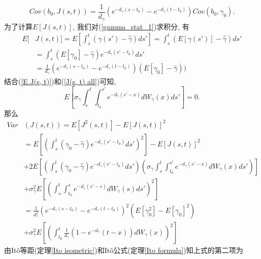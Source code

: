 \documentclass[notitlepage,cs4size,punct,oneside]{ctexrep}
\numberwithin{equation}{section}
\theoremstyle{mystyle}
\begin{document}
\begin{equation} \label{Cov b0 J(s, t)}
Cov(b_0, J(s, t)) = \frac{1}{d_\gamma}(e^{-d_\gamma(s-t_0)}-e^{-d_\gamma(t-t_0)})Cov(b_0, \gamma_0).
\end{equation}
为了计算$E[J(s, t)]$, 我们对(\ref{gamma_stat_1})求积分, 有
\begin{equation} \label{E J(s, t)}
\begin{split}
E[&J(s, t)] = E\left[\int_s^t (\gamma(s')-\hat{\gamma})ds'\right] = \int_s^t (E[\gamma(s')]-\hat{\gamma})ds' \\
&= \int_s^t (E[\gamma_0]-\hat{\gamma})e^{-d_\gamma(s'-t_0)}ds' \\
&= \frac{1}{d_\gamma}(e^{-d_\gamma(s-t_0)}-e^{-d_\gamma(t-t_0)})(E[\gamma_0]-\hat{\gamma}))
\end{split}
\end{equation}
结合(\ref{E J(s, t)})和(\ref{J(s, t) all})可知,
\begin{equation} \label{E J(s, t) 2}
E\left[\sigma_\gamma\int_s^t\int_{t_0}^{s'}e^{-d_\gamma(s'-x)}dW_\gamma(x)ds'\right] = 0.
\end{equation}
那么
\begin{equation} \label{Var J(s, t) process 1}
\begin{split}
Var&(J(s, t)) = E\left[J^2(s, t)\right] - E[J(s, t)]^2 \\
&= E\left[\left(\int_s^t (\gamma_0-\hat{\gamma})e^{-d_\gamma(s'-t_0)}ds'\right)^2\right] - E[J(s, t)]^2 \\
&+ 2E\left[\left(\int_s^t(\gamma_0-\hat{\gamma})e^{-d_\gamma(s'-t_0)}ds'\right)\left(\sigma_\gamma\int_s^t\int_{t_0}^{s'}e^{-d_\gamma(s'-x)}dW_\gamma(x)ds'\right)\right] \\
&+ \sigma_\gamma^2E\left[\left(\int_s^t\int_{t_0}^{s}e^{-d_\gamma(s'-s)}dW_\gamma(s)ds'\right)^2\right] \\
&= \frac{1}{d_\gamma^2}\left(e^{-d_\gamma(s-t_0)}-e^{-d_\gamma(t-t_0)}\right)^2(E[\gamma_0^2]-E[\gamma_0]^2) \\
&+ \sigma_\gamma^2E\left[\left(\int_{t_0}^t \frac{1}{d_\gamma}\left(1-e^{-d_\gamma}(t-x)\right)dW_\gamma(x)\right)^2\right]
\end{split}
\end{equation}
由It\^{o}等距(定理\ref{Ito isometric})和It\^{o}公式(定理\ref{Ito formula})知上式的第二项为
\end{document}
